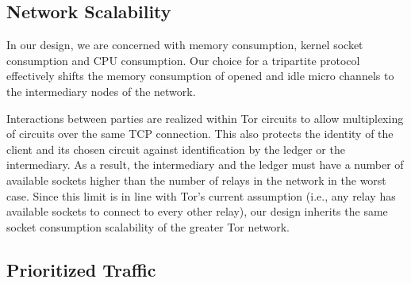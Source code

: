 \subsection{Network Scalability}
\label{subsub:scalability}

In our design, we are concerned with memory consumption, kernel socket
consumption and CPU consumption. Our choice for a tripartite protocol
effectively shifts the memory consumption of opened and idle micro
channels to the intermediary nodes of the network.
 

Interactions between parties are realized within Tor circuits to allow
multiplexing of circuits over the same TCP connection. This also protects the
identity of the client and its chosen circuit against identification by the
ledger or the intermediary.
 As a result, the intermediary and
the ledger must have a number of available sockets higher than the number of
relays in the network in the worst case. Since this limit is in line with Tor's
current assumption (i.e., any relay has available sockets to connect to every other relay), our design inherits the same socket consumption scalability
of the greater Tor network.

\subsection{Prioritized Traffic}
\label{subsub:prioritized}

